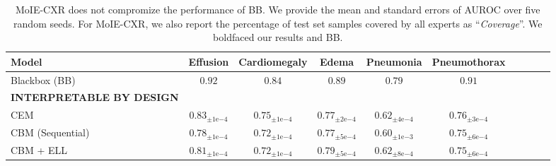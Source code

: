 \begin{table*}[h]
\caption{MoIE-CXR does not compromize the performance of BB. We 
provide the mean and standard errors of AUROC over five random seeds. For MoIE-CXR, we also report the percentage of test set samples covered by all experts as ``\emph{Coverage}''. We boldfaced our results and BB.}
\begin{adjustbox}{max width=1\textwidth, center}
\begin{tabular}{lccccccccc}
\toprule
\textbf{Model} &
  Effusion &
  Cardiomegaly &
  Edema &
  Pneumonia &
  Pneumothorax
  \\
\midrule 
  \scriptsize{Blackbox (BB)} & 
  \scriptsize{$\boldsymbol{0.92}$} & 
  \scriptsize{$\boldsymbol{0.84}$} & 
  \scriptsize{$\boldsymbol{0.89}$} & 
  \scriptsize{$\boldsymbol{0.79}$} 
  & \scriptsize{$\boldsymbol{0.91}$}
  \\
\midrule
\scriptsize{\textbf{INTERPRETABLE BY DESIGN}} \\
\scriptsize{CEM}~\cite{zarlenga2022concept} &
\scriptsize{$0.83_{\pm 1\mathrm{e}{-4}}$} &
\scriptsize{$0.75_{\pm 1\mathrm{e}{-4}}$} &
\scriptsize{$0.77_{\pm 2\mathrm{e}{-4}}$} &
\scriptsize{$0.62_{\pm 4\mathrm{e}{-4}}$} &
\scriptsize{$0.76_{\pm 3\mathrm{e}{-4}}$} &
\\
\scriptsize{CBM (Sequential)}~\cite{koh2020concept}  &  
\scriptsize{$0.78_{\pm 1\mathrm{e}{-4}}$} &
\scriptsize{$0.72_{\pm 1\mathrm{e}{-4}}$} &
\scriptsize{$0.77_{\pm 5\mathrm{e}{-4}}$} &
\scriptsize{$0.60_{\pm 1\mathrm{e}{-3}}$} &
\scriptsize{$0.75_{\pm 6\mathrm{e}{-4}}$} &
\\
\scriptsize{CBM + ELL}~\cite{koh2020concept, barbiero2022entropy}    &
\scriptsize{$0.81_{\pm 1\mathrm{e}{-4}}$} &
\scriptsize{$0.72_{\pm 1\mathrm{e}{-4}}$} &
\scriptsize{$0.79_{\pm 5\mathrm{e}{-4}}$} &
\scriptsize{$0.62_{\pm 8\mathrm{e}{-4}}$} &
\scriptsize{$0.75_{\pm 6\mathrm{e}{-4}}$} &
\\


\end{tabular}
\end{adjustbox}
\end{table*}
